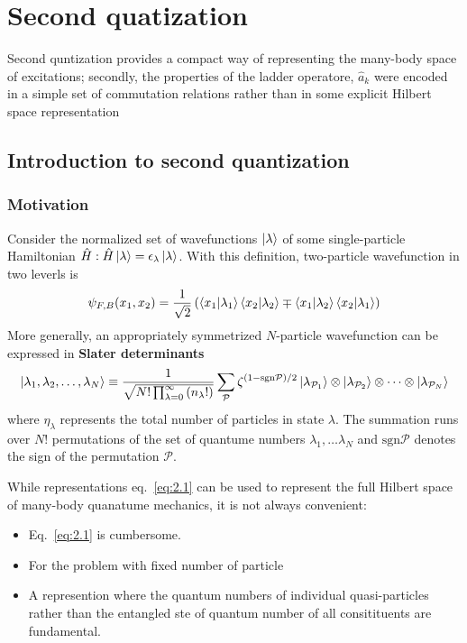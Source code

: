 \chapter{Second quatization}
Second quntization provides a compact way of representing the many-body space of excitations;
secondly, the properties of the ladder operatore, $\hat{a}_k$ were encoded in a simple set of commutation relations rather than in some explicit Hilbert space representation

\section{Introduction to second quantization}\label{sec:2.1}
\subsection{Motivation}
Consider the normalized set of wavefunctions $\ket{\lambda}$ of some single-particle Hamiltonian $\hat{H}: \hat{H}\ket{\lambda} = \epsilon_\lambda \ket{\lambda}$.
With this definition, two-particle wavefunction in two leverls is
\begin{equation}
\psi_{F,B}(x_1,x_2) = \frac{1}{\sqrt{2}} \left(\braket{x_1}{\lambda_1} \braket{x_2}{\lambda_2} \mp \braket{x_1}{\lambda_2} \braket{x_2}{\lambda_1} \right)
\end{equation}
More generally, an appropriately symmetrized $N$-particle wavefunction can be expressed in \textbf{Slater determinants}
\begin{equation}
    \ket{\lambda_1, \lambda_2,\dots, \lambda_N} \equiv \frac{1}{\sqrt{ N ! \prod^\infty_{\lambda=0}\left( n_\lambda ! \right)}} \sum_\mathcal{P} \zeta^{(1 - \mathrm{sgn} \mathcal{P})/2}  \ket{\lambda_{\mathcal{P}_1}} \otimes \ket{\lambda_{\mathcal{P}_2}} \otimes \dots \otimes \ket{\lambda_{\mathcal{P}_N}}
    \label{eq:2.1}
\end{equation}
where $\eta_\lambda$ represents the total number of particles in state $\lambda$.
The summation runs over $N!$ permutations of the set of quantume numbers ${\lambda_1,\dots \lambda_N}$ and $\mathrm{sgn}\mathcal{P}$ denotes the sign of the permutation $\mathcal{P}$.

While representations eq.~\eqref{eq:2.1} can be used to represent the full Hilbert space of many-body quanatume mechanics, it is not always convenient:
\begin{itemize}
    \item Eq.~\eqref{eq:2.1} is cumbersome.
    \item For the problem with fixed number of particle
    \item A represention where the quantum numbers of individual quasi-particles rather than the entangled ste of quantum number of all consitituents are fundamental.
\end{itemize}

